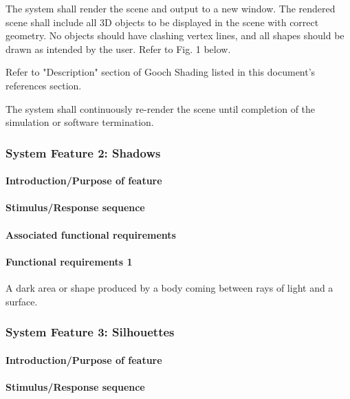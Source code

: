 \documentclass[10pt,journal,compsoc,draftclsnofoot]{IEEEtran}
\begin{document}
\begin{flushleft}
\vspace{3mm}
The system shall render the scene and output to a new window.
The rendered scene shall include all 3D objects to be displayed in the scene with correct geometry.
No objects should have clashing vertex lines, and all shapes should be drawn as intended by the user.
Refer to Fig. 1 below.

\vspace{3mm}
Refer to "Description" section of Gooch Shading listed in this document's references section.

\vspace{3mm}
The system shall continuously re-render the scene until completion of the simulation or software termination.


\subsubsection{System Feature 2: Shadows}

\paragraph{Introduction/Purpose of feature}

\paragraph{Stimulus/Response sequence}

\paragraph{Associated functional requirements}

\paragraph{Functional requirements 1}
A dark area or shape produced by a body coming between rays of light and a surface.


\subsubsection{System Feature 3: Silhouettes}

\paragraph{Introduction/Purpose of feature}

\paragraph{Stimulus/Response sequence}


\end{flushleft}
\end{document}
